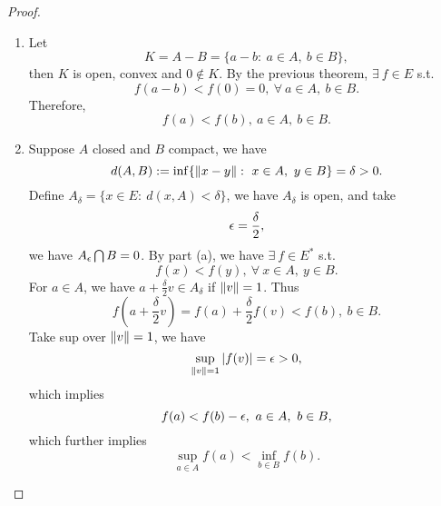 \begin{proof}\
\begin{enumerate}[label = (\alph*)]
    \item Let 
    \begin{equation*}
        K = A -B = \{a - b:\ a \in A,\ b \in B\},
    \end{equation*}
    then $K$ is open, convex and $0 \not\in K$. By the previous theorem, $\exists\ f \in E$ s.t.
    \begin{equation*}
        f(a - b) < f(0) = 0,\ \forall\ a \in A,\ b \in B.
    \end{equation*}
    Therefore,
    \begin{equation*}
        f(a) < f(b),\ a \in A,\ b \in B.
    \end{equation*}
    \item Suppose $A$ closed and $B$ compact, we have
    \begin{equation*}
        d(A,B) := \inf\{\norm{x - y}:\ x \in A,\ y \in B\} = \delta > 0.
    \end{equation*}
    Define $A_\delta = \{x \in E:\ d(x,A) < \delta\}$, we have $A_\delta$ is open, and take
    \begin{equation*}
        \epsilon = \frac{\delta}{2},
    \end{equation*}
    we have $A_\epsilon \bigcap B = 0$. By part (a), we have $\exists\ f \in E^*$ s.t.
    \begin{equation*}
        f(x) < f(y),\ \forall\ x \in A,\ y \in B.
    \end{equation*}
    For $a \in A$, we have $a + \frac{\delta}{2} v \in A_\delta$ if $\norm{v} = 1$. Thus
    \begin{equation*}
        f(a + \frac{\delta}{2} v) = f(a) + \frac{\delta}{2} f(v) < f(b),\ b \in B.
    \end{equation*}
    Take sup over $\norm{v} = 1$, we have
    \begin{equation*}
        \sup_{\norm{v} = 1} \abs{f(v)} = \epsilon > 0,
    \end{equation*}
    which implies 
    \begin{equation*}
        f(a) < f(b) - \epsilon,\ a \in A,\ b \in B,
    \end{equation*}
    which further implies
    \begin{equation*}
        \sup_{a \in A} f(a) < \inf_{ b \in B} f(b).
    \end{equation*}
\end{enumerate}
\end{proof}

